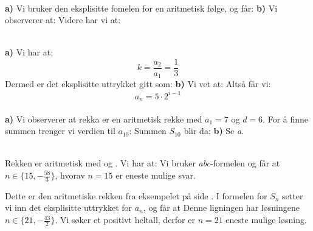 




\\
\textbf{a)}
Vi bruker den eksplisitte fomelen for en aritmetisk følge, og får:
\textbf{b)}
Vi observerer at:
Videre har vi at:\vs
{}

\\
\textbf{a)}
Vi har at:
\[ k=\frac{a_2}{a_1}= \frac{1}{3}\]
Dermed er det eksplisitte uttrykket gitt som:
\textbf{b)}
Vi vet at:
Altså får vi:
\[ a_n = 5\cdot2^{i-1} \]
\newpage
{}\\
\textbf{a)} Vi observerer at rekka er en aritmetisk rekke med $ a_1= 7$ og $ d= 6$. For å finne summen trenger vi verdien til $ a_{10} $:
Summen $ S_{10} $ blir da:
\textbf{b)} Se \textsl{a}.

 \\
Rekken er aritmetisk med  og . Vi har at:
Vi bruker \textit{abc}-formelen og får at $ {n\in\lbrace15, -\frac{58}{3}\rbrace} $, hvorav $ {n=15} $ er eneste mulige svar. 

Dette er den aritmetiske rekken fra eksempelet på side \pageref{arrekeks}. I formelen for $ S_n $ setter vi inn det eksplisitte uttrykket for $ a_n $, og får at	
Denne ligningen har løsningene $ {n\in \big\lbrace21, -\frac{43}{2} \big\rbrace}$. Vi søker et positivt heltall, derfor er $ {n=21} $ eneste mulige løsning.

